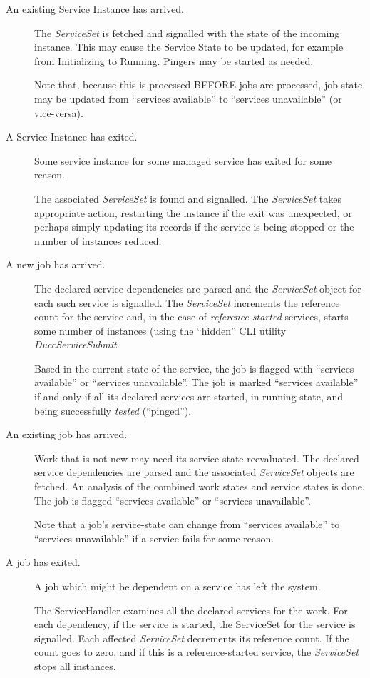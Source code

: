 \begin{description}
      \item[An existing Service Instance has arrived.]  The {\em ServiceSet} is
        fetched and signalled with the state of the incoming instance.  This may cause
        the Service State to be updated, for example from Initializing to Running.  Pingers
        may be started as needed.

        Note that, because this is processed BEFORE jobs are processed, job state may be
        updated from ``services available'' to ``services unavailable'' (or vice-versa).

      \item[A Service Instance has exited.]  Some service instance for some managed
        service has exited for some reason.

        The associated {\em ServiceSet} is found and signalled.  The {\em ServiceSet}
        takes appropriate action, restarting the instance if the exit
        was unexpected, or perhaps simply updating its records if the service is
        being stopped or the number of instances reduced.

      \item[A new job has arrived.]  
        The declared service dependencies are parsed and the {\em ServiceSet}
        object for each such service is signalled.   The {\em ServiceSet} increments the reference count for
        the service and, in the case of {\em reference-started}
        services, starts some number of instances (using the ``hidden'' CLI utility
        {\em DuccServiceSubmit}.

        Based in the current state of the service, the job is flagged with ``services available'' or
        ``services unavailable''.  The job is marked ``services available'' if-and-only-if all
        its declared services are started, in running state, and being successfully {\em tested} (``pinged'').

      \item[An existing job has arrived.]  Work that is not new may need its service state reevaluated.
        The declared service dependencies are parsed and the associated {\em ServiceSet}
        objects are fetched.  An analysis of the combined work states and service
        states is done.  The job is flagged ``services available'' or ``services unavailable''.

        Note that a job's service-state can change from ``services available'' to ``services
        unavailable'' if a service fails for some reason.

      \item[A job has exited.]  A job which might be dependent
        on a service has left the system. 

        The ServiceHandler examines all the declared services for the work.  For each
        dependency, if the service is started, the ServiceSet for the service is 
        signalled.  Each affected {\em ServiceSet} decrements its reference count.  If the
        count goes to zero, and if this is
        a reference-started service, the {\em ServiceSet} stops all instances.
          
    \end{description}
    
